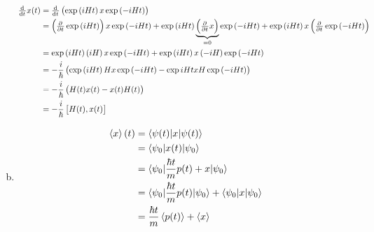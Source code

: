 \documentclass[a4paper,german,12pt,smallheadings]{scrartcl}
\begin{document}
\begin{enumerate}[a)]
    \begin{align*}
      \od{}{t} x(t) &= \od{}{t} \del{\exp\del{iHt} x \exp\del{-iHt}} \\
                    &= \del{\pd{}{t} \exp\del{iHt}} x \exp\del{-iHt} +
                       \exp\del{iHt} \underbrace{\del{\pd{}{t} x}}_{=0} \exp\del{-iHt} +
                       \exp\del{iHt} x \del{\pd{}{t} \exp\del{-iHt}} \\
                    &= \exp\del{iHt} \del{iH} x \exp\del{-iHt} + \exp\del{iHt}x \del{-iH} \exp\del{-iHt} \\
                    &= -\frac{i}{\hbar}\del{\exp\del{iHt} H x \exp\del{-iHt} - \exp{iHt}xH\exp\del{-iHt}} \\
                    &= -\frac{i}{\hbar}\del{H(t)x(t) - x(t)H(t)} \\
                    &= -\frac{i}{\hbar} \sbr{H(t), x(t)}
    \end{align*}
  \item
    \begin{align*}
      \braket{x}(t) &= \braket{\psi(t)|x|\psi(t)} \\
                    &= \braket{\psi_0|x(t)|\psi_0} \\
                    &= \braket{\psi_0|\frac{\hbar t}{m} p(t) + x|\psi_0} \\
                    &= \braket{\psi_0|\frac{\hbar t}{m} p(t)|\psi_0} + \braket{\psi_0|x|\psi_0} \\
                    &= \frac{\hbar t}{m} \braket{p(t)} + \braket{x}
    \end{align*}
\end{enumerate}
\end{document}
